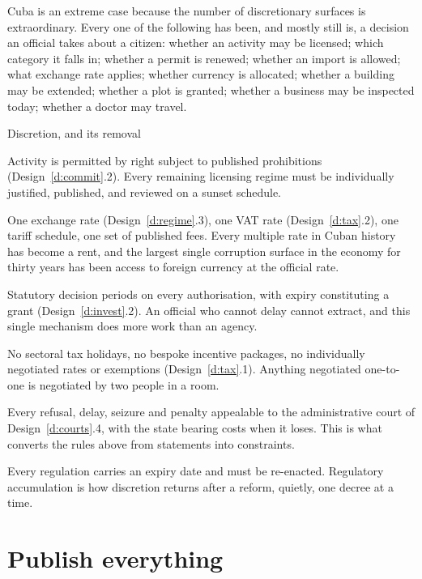 Cuba is an extreme case because the number of discretionary surfaces is
extraordinary. Every one of the following has been, and mostly still is, a
decision an official takes about a citizen: whether an activity may be licensed;
which category it falls in; whether a permit is renewed; whether an import is
allowed; what exchange rate applies; whether currency is allocated; whether a
building may be extended; whether a plot is granted; whether a business may be
inspected today; whether a doctor may travel.

\begin{design}{Discretion, and its removal}
\label{d:discretion}
\begin{rules}
 Activity is permitted by right subject to
published prohibitions (Design~\ref{d:commit}.2). Every remaining licensing
regime must be individually justified, published, and reviewed on a sunset
schedule.

 One exchange rate (Design~\ref{d:regime}.3), one VAT rate
(Design~\ref{d:tax}.2), one tariff schedule, one set of published fees. Every
multiple rate in Cuban history has become a rent, and the largest single
corruption surface in the economy for thirty years has been access to foreign
currency at the official rate.

 Statutory decision periods on every authorisation, with
expiry constituting a grant (Design~\ref{d:invest}.2). An official who cannot
delay cannot extract, and this single mechanism does more work than an agency.

 No sectoral tax holidays, no bespoke incentive
packages, no individually negotiated rates or exemptions
(Design~\ref{d:tax}.1). Anything negotiated one-to-one is negotiated by two
people in a room.

 Every refusal, delay, seizure and penalty appealable to
the administrative court of Design~\ref{d:courts}.4, with the state bearing costs
when it loses. This is what converts the rules above from statements into
constraints.

 Every regulation carries an expiry date and must be re-enacted.
Regulatory accumulation is how discretion returns after a reform, quietly, one
decree at a time.
\end{rules}
\end{design}

\section{Publish everything}

